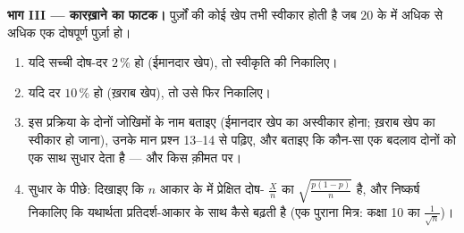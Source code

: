 \begin{problem}
\medskip
\noindent\textbf{भाग III --- कारख़ाने का फाटक।}
पुर्ज़ों की कोई खेप तभी स्वीकार होती है जब $20$ के  में अधिक से अधिक
एक दोषपूर्ण पुर्ज़ा हो।
\begin{enumerate}[resume]
  \item यदि सच्ची दोष-दर $2\,\%$ हो (ईमानदार खेप), तो स्वीकृति की 
        निकालिए।
  \item यदि दर $10\,\%$ हो (ख़राब खेप), तो उसे फिर निकालिए।
  \item इस प्रक्रिया के दोनों जोखिमों के नाम बताइए (ईमानदार खेप का अस्वीकार
        होना; ख़राब खेप का स्वीकार हो जाना), उनके मान प्रश्न 13--14 से पढ़िए,
        और बताइए कि कौन-सा एक बदलाव दोनों को एक साथ सुधार देता है --- और किस
        क़ीमत पर।
  \item सुधार के पीछे: दिखाइए कि $n$ आकार के  में प्रेक्षित
        दोष-\emph{} $\frac Xn$ का  $\sqrt{\frac{p(1-p)}{n}}$ है, और
        निष्कर्ष निकालिए कि यथार्थता प्रतिदर्श-आकार के साथ कैसे बढ़ती है (एक
        पुराना मित्र: कक्षा 10 का $\frac{1}{\sqrt n}$)।
\end{enumerate}


\end{problem}

